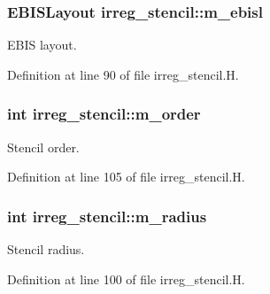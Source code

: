\subsubsection[{\texorpdfstring{m\+\_\+ebisl}{m_ebisl}}]{\setlength{\rightskip}{0pt plus 5cm}E\+B\+I\+S\+Layout irreg\+\_\+stencil\+::m\+\_\+ebisl\hspace{0.3cm}{\ttfamily [protected]}}\hypertarget{classirreg__stencil_a644aa60f2b1b8d6a3c29011507b3ef9c}{}\label{classirreg__stencil_a644aa60f2b1b8d6a3c29011507b3ef9c}


E\+B\+IS layout. 



Definition at line 90 of file irreg\+\_\+stencil.\+H.

\subsubsection[{\texorpdfstring{m\+\_\+order}{m_order}}]{\setlength{\rightskip}{0pt plus 5cm}int irreg\+\_\+stencil\+::m\+\_\+order\hspace{0.3cm}{\ttfamily [protected]}}\hypertarget{classirreg__stencil_adefb470504307aaee747dc827db5a678}{}\label{classirreg__stencil_adefb470504307aaee747dc827db5a678}


Stencil order. 



Definition at line 105 of file irreg\+\_\+stencil.\+H.

\subsubsection[{\texorpdfstring{m\+\_\+radius}{m_radius}}]{\setlength{\rightskip}{0pt plus 5cm}int irreg\+\_\+stencil\+::m\+\_\+radius\hspace{0.3cm}{\ttfamily [protected]}}\hypertarget{classirreg__stencil_a59816b002cf4a6d0b7b60d60c9b9da31}{}\label{classirreg__stencil_a59816b002cf4a6d0b7b60d60c9b9da31}


Stencil radius. 



Definition at line 100 of file irreg\+\_\+stencil.\+H.

